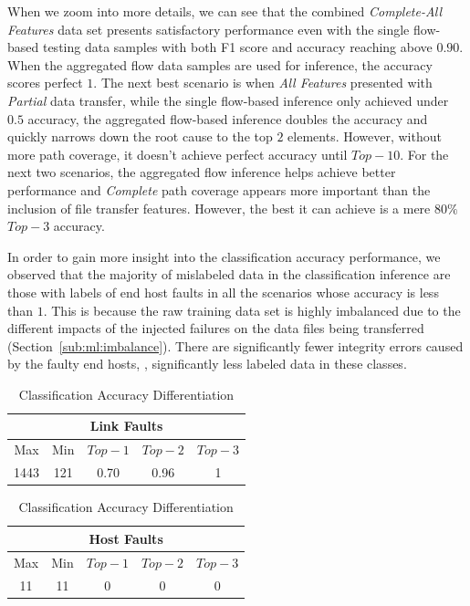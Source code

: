 When we zoom into more details, we can see that the combined {\it Complete-All Features} data set presents satisfactory performance even with the single flow-based testing data samples with 
both F1 score and accuracy reaching above $0.90$. When the aggregated flow data samples are used for inference, the accuracy scores perfect $1$. The next best scenario is when {\it All Features} presented with 
{\it Partial} data transfer, while the single flow-based inference only achieved under $0.5$ accuracy, the aggregated flow-based inference doubles the accuracy and quickly narrows down the root cause to the 
top $2$ elements. However, without more path coverage, it doesn't achieve perfect accuracy until $Top-10$. For the next two scenarios, the aggregated flow inference helps achieve better performance 
and {\it Complete} path coverage appears more important than the inclusion of file transfer features. However, the best it can achieve is a mere $80\%$ $Top-3$ accuracy.  

In order to gain more insight into the classification accuracy performance, we observed that the majority of mislabeled data in the classification inference are those with labels of end host faults in all the scenarios whose accuracy is less than $1$.  This is because the raw training data set is highly imbalanced due to the different impacts of the injected failures on the data files being transferred (Section~\ref{sub:ml:imbalance}). There are significantly fewer integrity errors caused by the faulty end hosts, \ie, significantly less labeled data in these classes. 

\begin{table}[!ht]
\caption{Classification Accuracy Differentiation}
\label{tab:class}
\vspace{-0.1in}
\begin{center}
\begin{tabular}{ |c|c|c|c|c| } 
 \hline
  \multicolumn{5}{|c|}{Link Faults} \\
 \hline
 Max & Min & $Top-1$ & $Top-2$ & $Top-3$\\ 
 \hline
 1443 & 121  & 0.70 &  0.96 & 1 \\
 \hline
\end{tabular}

\begin{tabular}{ |c|c|c|c|c|} 
 \hline
\multicolumn{5}{|c|}{Host Faults} \\
 \hline
 Max & Min & $Top-1$ & $Top-2$ & $Top-3$ \\ 
 \hline
11 & 11  & 0 &  0 & 0\\
  \hline
\end{tabular}
\end{center}
\end{table}

